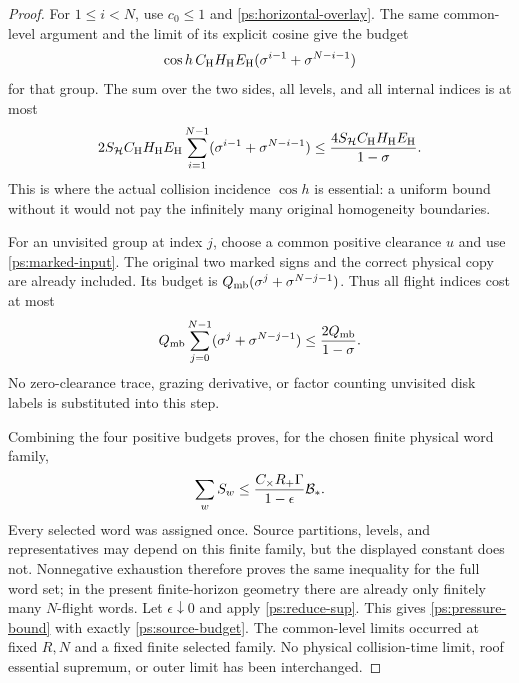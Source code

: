 \begin{proof}
For $1\le i<N$, use $c_0\le1$ and
\eqref{ps:horizontal-overlay}.  The same common-level argument
and the limit of its explicit cosine give the budget
\[
 \cos h\,C_{\rm H}H_{\rm H}E_{\rm H}
                       (\sigma^{i-1}+\sigma^{N-i-1})
\]
for that group.  The sum over the two sides, all levels, and all
internal indices is at most
\[
 2S_{\mathcal H}C_{\rm H}H_{\rm H}E_{\rm H}
       \sum_{i=1}^{N-1}(\sigma^{i-1}+\sigma^{N-i-1})
 \le {4S_{\mathcal H}C_{\rm H}H_{\rm H}E_{\rm H}\over1-\sigma}.
\]
This is where the actual collision incidence $\cos h$ is
essential: a uniform bound without it would not pay the
infinitely many original homogeneity boundaries.

For an unvisited group at index $j$, choose a common positive
clearance $u$ and use \eqref{ps:marked-input}.
The original two marked signs and the correct physical copy
are already included.  Its budget is
$Q_{\rm mb}(\sigma^j+\sigma^{N-j-1})$.  Thus all flight indices
cost at most
\[
 Q_{\rm mb}\sum_{j=0}^{N-1}(\sigma^j+\sigma^{N-j-1})
                      \le {2Q_{\rm mb}\over1-\sigma}.
\]
No zero-clearance trace, grazing derivative, or factor counting
unvisited disk labels is substituted into this step.

Combining the four positive budgets proves, for the chosen
finite physical word family,
\[
 \sum_w S_w\le
 {C_\times R_+\Gamma\over1-\epsilon}\mathcal B_*.
\]
Every selected word was assigned once.  Source partitions,
levels, and representatives may depend on this finite family,
but the displayed constant does not.  Nonnegative exhaustion
therefore proves the same inequality for the full word set;
in the present finite-horizon geometry there are already only
finitely many $N$-flight words.  Let $\epsilon\downarrow0$ and
apply \eqref{ps:reduce-sup}.  This gives
\eqref{ps:pressure-bound} with exactly \eqref{ps:source-budget}.
The common-level limits occurred at fixed $R,N$ and a fixed
finite selected family.  No physical collision-time limit,
roof essential supremum, or outer limit has been interchanged.
\end{proof}

